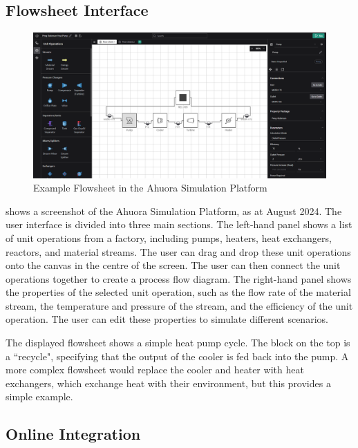 \documentclass[12pt]{report}
\begin{document}
\subsection{Flowsheet Interface}


\begin{figure}
    \centering
    \includegraphics[width=\textwidth]{platform_screenshot.png}
    \caption{Example Flowsheet in the Ahuora Simulation Platform}
    \label{fig:platform}
\end{figure}

 shows a screenshot of the Ahuora Simulation Platform, as at August 2024. The user interface is divided into three main sections. The left-hand panel shows a list of unit operations from a factory, including pumps, heaters, heat exchangers, reactors, and material streams. The user can drag and drop these unit operations onto the canvas in the centre of the screen. The user can then connect the unit operations together to create a process flow diagram. The right-hand panel shows the properties of the selected unit operation, such as the flow rate of the material stream, the temperature and pressure of the stream, and the efficiency of the unit operation. The user can edit these properties to simulate different scenarios.

The displayed flowsheet shows a simple heat pump cycle. The block on the top is a ``recycle", specifying that the output of the cooler is fed back into the pump. A more complex flowsheet would replace the cooler and heater with heat exchangers, which exchange heat with their environment, but this provides a simple example.

\subsection{Online Integration}
\end{document}
